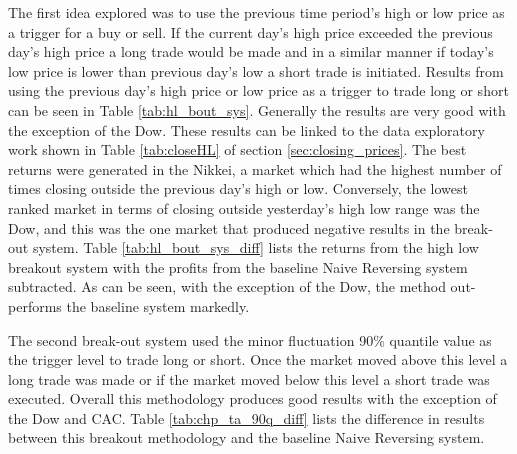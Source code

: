 The first idea explored was to use the previous time period's high or low price as a trigger for a buy or sell. If the current day's high price exceeded the previous day's high price a long trade would be made and in a similar manner if today's low price is lower than previous day's low a short trade is initiated. Results from using the previous day's high price or low price as a trigger to trade long or short can be seen in Table \ref{tab:hl_bout_sys}. Generally the results are very good with the exception of the Dow. These results can be linked to the data exploratory work shown in Table \ref{tab:closeHL} of section \ref{sec:closing_prices}. The best returns were generated in the Nikkei, a market which had the highest number of times closing outside the previous day's high or low. Conversely, the lowest ranked market in terms of closing outside yesterday's high low range was the Dow, and this was the one market that produced negative results in the break-out system. Table \ref{tab:hl_bout_sys_diff} lists the returns from the high low breakout system with the profits from the baseline Naive Reversing system subtracted. As can be seen, with the exception of the Dow, the method out-performs the baseline system markedly.



The second break-out system used the minor fluctuation 90\% quantile value as the trigger level to trade long or short. Once the market moved above this level a long trade was made or if the market moved below this level a short trade was executed. Overall this methodology produces good results with the exception of the Dow and CAC. Table \ref{tab:chp_ta_90q_diff} lists the difference in results between this breakout methodology and the baseline Naive Reversing system.



